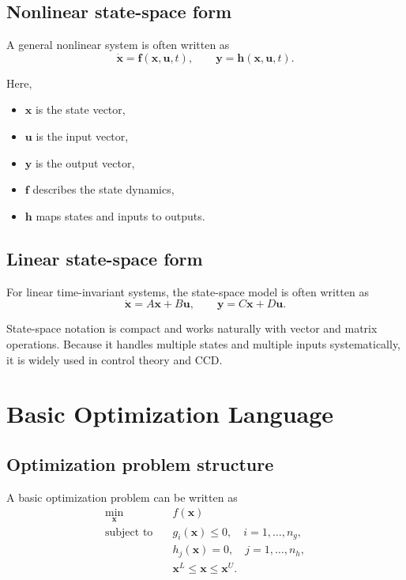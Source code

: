 \documentclass[11pt]{article}
\newcommand{\vect}[1]{\boldsymbol{#1}}
\newcommand{\xstate}{\vect{x}}
\newcommand{\uvec}{\vect{u}}
\newcommand{\yvec}{\vect{y}}
\begin{document}
\subsection{Nonlinear state-space form}

A general nonlinear system is often written as
\begin{equation}
\dot{\xstate}=\vect{f}(\xstate,\uvec,t),
\qquad
\yvec=\vect{h}(\xstate,\uvec,t).
\end{equation}

Here,
\begin{itemize}[leftmargin=1.4em]
  \item $\xstate$ is the state vector,
  \item $\uvec$ is the input vector,
  \item $\yvec$ is the output vector,
  \item $\vect{f}$ describes the state dynamics,
  \item $\vect{h}$ maps states and inputs to outputs.
\end{itemize}

\subsection{Linear state-space form}

For linear time-invariant systems, the state-space model is often written as
\begin{equation}
\dot{\xstate}=A\xstate+B\uvec,
\qquad
\yvec=C\xstate + D\uvec.
\end{equation}

State-space notation is compact and works naturally with vector and matrix operations. Because it handles multiple states and multiple inputs systematically, it is widely used in control theory and CCD.

\section{Basic Optimization Language}

\subsection{Optimization problem structure}

A basic optimization problem can be written as
\begin{align}
\min_{\vect{x}} \quad & f(\vect{x}) \\
\text{subject to} \quad & g_i(\vect{x})\le 0, \quad i=1,\ldots,n_g, \\
& h_j(\vect{x})=0, \quad j=1,\ldots,n_h, \\
& \vect{x}^{L}\le \vect{x}\le \vect{x}^{U}.
\end{align}
\end{document}
